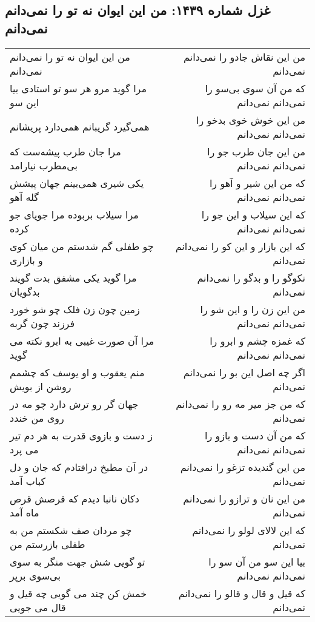 \begin{center}
\section*{غزل شماره ۱۴۳۹: من این ایوان نه تو را نمی‌دانم نمی‌دانم}
\label{sec:1439}
\begin{longtable}{l p{0.5cm} r}
من این ایوان نه تو را نمی‌دانم نمی‌دانم
&&
من این نقاش جادو را نمی‌دانم نمی‌دانم
\\
مرا گوید مرو هر سو تو استادی بیا این سو
&&
که من آن سوی بی‌سو را نمی‌دانم نمی‌دانم
\\
همی‌گیرد گریبانم همی‌دارد پریشانم
&&
من این خوش خوی بدخو را نمی‌دانم نمی‌دانم
\\
مرا جان طرب پیشه‌ست که بی‌مطرب نیارامد
&&
من این جان طرب جو را نمی‌دانم نمی‌دانم
\\
یکی شیری همی‌بینم جهان پیشش گله آهو
&&
که من این شیر و آهو را نمی‌دانم نمی‌دانم
\\
مرا سیلاب بربوده مرا جویای جو کرده
&&
که این سیلاب و این جو را نمی‌دانم نمی‌دانم
\\
چو طفلی گم شدستم من میان کوی و بازاری
&&
که این بازار و این کو را نمی‌دانم نمی‌دانم
\\
مرا گوید یکی مشفق بدت گویند بدگویان
&&
نکوگو را و بدگو را نمی‌دانم نمی‌دانم
\\
زمین چون زن فلک چو شو خورد فرزند چون گربه
&&
من این زن را و این شو را نمی‌دانم نمی‌دانم
\\
مرا آن صورت غیبی به ابرو نکته می گوید
&&
که غمزه چشم و ابرو را نمی‌دانم نمی‌دانم
\\
منم یعقوب و او یوسف که چشمم روشن از بویش
&&
اگر چه اصل این بو را نمی‌دانم نمی‌دانم
\\
جهان گر رو ترش دارد چو مه در روی من خندد
&&
که من جز میر مه رو را نمی‌دانم نمی‌دانم
\\
ز دست و بازوی قدرت به هر دم تیر می پرد
&&
که من آن دست و بازو را نمی‌دانم نمی‌دانم
\\
در آن مطبخ درافتادم که جان و دل کباب آمد
&&
من این گندیده تزغو را نمی‌دانم نمی‌دانم
\\
دکان نانبا دیدم که قرصش قرص ماه آمد
&&
من این نان و ترازو را نمی‌دانم نمی‌دانم
\\
چو مردان صف شکستم من به طفلی بازرستم من
&&
که این لالای لولو را نمی‌دانم نمی‌دانم
\\
تو گویی شش جهت منگر به سوی بی‌سوی برپر
&&
بیا این سو من آن سو را نمی‌دانم نمی‌دانم
\\
خمش کن چند می گویی چه قیل و قال می جویی
&&
که قیل و قال و قالو را نمی‌دانم نمی‌دانم

\end{longtable}
\end{center}
